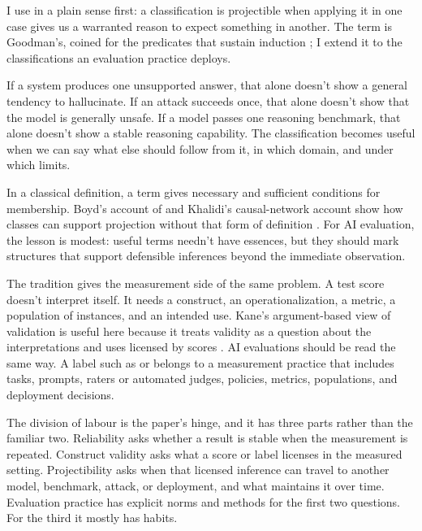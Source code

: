\documentclass[12pt]{article}
\begin{document}
I use  in a plain sense first: a classification is
projectible when applying it in one case gives us a warranted reason to expect
something in another. The term is Goodman's, coined for the predicates that
sustain induction \citep{Goodman1955}; I extend it to the classifications an
evaluation practice deploys.

If a system produces one
unsupported answer, that alone doesn't show a general tendency to hallucinate.
If an attack succeeds once, that alone doesn't show that the model is generally
unsafe. If a model passes one reasoning benchmark, that alone doesn't show a
stable reasoning capability. The classification becomes useful when we can say
what else should follow from it, in which domain, and under which limits.

In a classical definition, a
term gives necessary and sufficient conditions for membership. Boyd's account
of  and Khalidi's causal-network account
show how classes can support projection without that form of definition
\citep{boyd1991,boyd1999,khalidi2018causal}. For AI evaluation, the lesson is
modest: useful terms needn't have essences, but they should mark structures that
support defensible inferences beyond the immediate observation.

The  tradition gives the measurement side of the same
problem. A test score doesn't interpret itself. It needs a construct, an
operationalization, a metric, a population of instances, and an intended use.
Kane's argument-based view of validation is useful here because it treats
validity as a question about the interpretations and uses licensed by scores
\citep{kane2013validating}. AI evaluations should be read the same way. A label
such as  or  belongs to a measurement
practice that includes tasks, prompts, raters or automated judges, policies,
metrics, populations, and deployment decisions.

The division of labour is the paper's hinge, and it has three parts rather than
the familiar two. Reliability asks whether a result is stable when the
measurement is repeated. Construct validity asks what a
score or label licenses in the measured setting. Projectibility asks when that
licensed inference can travel to another model, benchmark, attack, or
deployment, and what maintains it over time. Evaluation practice has explicit
norms and methods for the first two questions. For the third it mostly has
habits.
\end{document}
